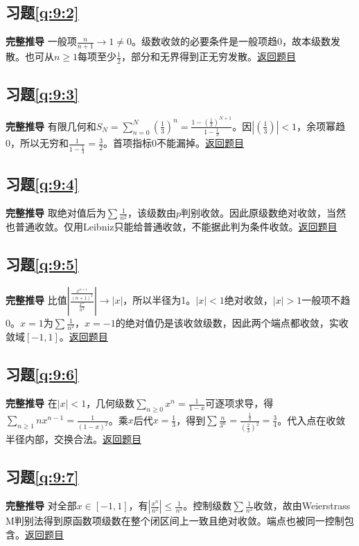 \subsection*{习题\ref{q:9:2}}\label{a:9:2}\textbf{完整推导} 一般项$\frac{n}{n+1}\to1\ne0$。级数收敛的必要条件是一般项趋0，故本级数发散。也可从$n\ge1$每项至少$\frac{1}{2}$，部分和无界得到正无穷发散。\quad\hyperref[q:9:2]{返回题目}

\subsection*{习题\ref{q:9:3}}\label{a:9:3}\textbf{完整推导} 有限几何和$S_N=\sum_{n=0}^N(\frac{1}{3})^n=\frac{1-(\frac{1}{3})^{N+1}}{1-\frac{1}{3}}$。因$|(\frac{1}{3})|<1$，余项幂趋0，所以无穷和$\frac{1}{1-\frac{1}{3}}=\frac{3}{2}$。首项指标0不能漏掉。\quad\hyperref[q:9:3]{返回题目}

\subsection*{习题\ref{q:9:4}}\label{a:9:4}\textbf{完整推导} 取绝对值后为$\sum\frac{1}{n^2}$，该级数由$p$判别收敛。因此原级数绝对收敛，当然也普通收敛。仅用Leibniz只能给普通收敛，不能据此判为条件收敛。\quad\hyperref[q:9:4]{返回题目}

\subsection*{习题\ref{q:9:5}}\label{a:9:5}\textbf{完整推导} 比值$\left|\frac{\frac{x^{n+1}}{(n+1)^2}}{\frac{x^n}{n^2}}\right|\to|x|$，所以半径为1。$|x|<1$绝对收敛，$|x|>1$一般项不趋0。$x=1$为$\sum\frac{1}{n^2}$，$x=-1$的绝对值仍是该收敛级数，因此两个端点都收敛，实收敛域$[-1,1]$。\quad\hyperref[q:9:5]{返回题目}

\subsection*{习题\ref{q:9:6}}\label{a:9:6}\textbf{完整推导} 在$|x|<1$，几何级数$\sum_{n\ge0}x^n=\frac{1}{1-x}$可逐项求导，得$\sum_{n\ge1}nx^{n-1}=\frac{1}{(1-x)^2}$。乘$x$后代$x=\frac{1}{3}$，得到$\sum \frac{n}{3^n}=\frac{\frac{1}{3}}{(\frac{2}{3})^2}=\frac{3}{4}$。代入点在收敛半径内部，交换合法。\quad\hyperref[q:9:6]{返回题目}

\subsection*{习题\ref{q:9:7}}\label{a:9:7}\textbf{完整推导} 对全部$x\in[-1,1]$，有$|\frac{x^n}{n^2}|\le\frac{1}{n^2}$。控制级数$\sum\frac{1}{n^2}$收敛，故由Weierstrass M判别法得到原函数项级数在整个闭区间上一致且绝对收敛。端点也被同一控制包含。\quad\hyperref[q:9:7]{返回题目}

